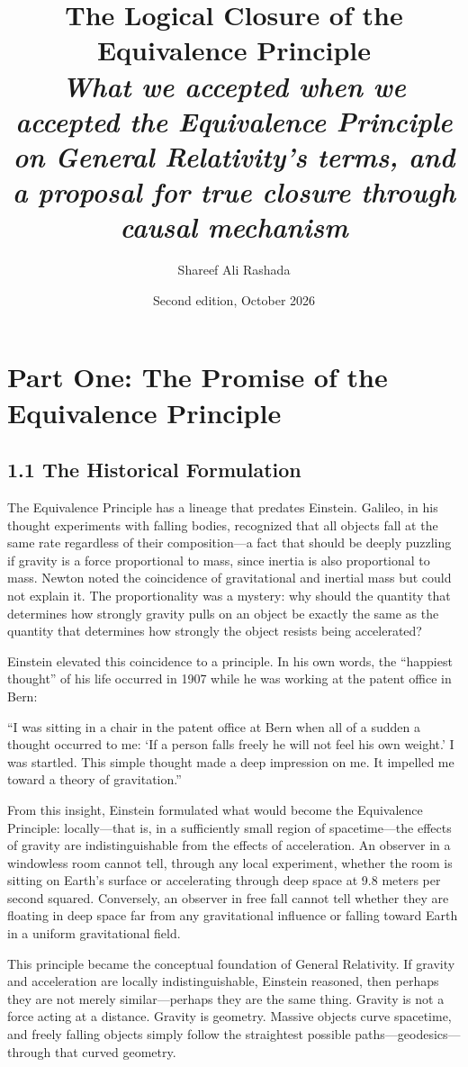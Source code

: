 \documentclass[11pt]{article}
\title{The Logical Closure of the Equivalence Principle\\[0.4em]
\large\itshape What we accepted when we accepted the Equivalence Principle on General Relativity's terms, and a proposal for true closure through causal mechanism}
\author{Shareef Ali Rashada}
\date{Second edition, October 2026}
\begin{document}
\maketitle

\section{Part One: The Promise of the Equivalence Principle}

\subsection{1.1 The Historical Formulation}

The Equivalence Principle has a lineage that predates Einstein. Galileo, in his thought experiments with falling bodies, recognized that all objects fall at the same rate regardless of their composition---a fact that should be deeply puzzling if gravity is a force proportional to mass, since inertia is also proportional to mass. Newton noted the coincidence of gravitational and inertial mass but could not explain it. The proportionality was a mystery: why should the quantity that determines how strongly gravity pulls on an object be exactly the same as the quantity that determines how strongly the object resists being accelerated?

Einstein elevated this coincidence to a principle. In his own words, the ``happiest thought'' of his life occurred in 1907 while he was working at the patent office in Bern:

``I was sitting in a chair in the patent office at Bern when all of a sudden a thought occurred to me: `If a person falls freely he will not feel his own weight.' I was startled. This simple thought made a deep impression on me. It impelled me toward a theory of gravitation.''

From this insight, Einstein formulated what would become the Equivalence Principle: locally---that is, in a sufficiently small region of spacetime---the effects of gravity are indistinguishable from the effects of acceleration. An observer in a windowless room cannot tell, through any local experiment, whether the room is sitting on Earth's surface or accelerating through deep space at 9.8 meters per second squared. Conversely, an observer in free fall cannot tell whether they are floating in deep space far from any gravitational influence or falling toward Earth in a uniform gravitational field.

This principle became the conceptual foundation of General Relativity. If gravity and acceleration are locally indistinguishable, Einstein reasoned, then perhaps they are not merely similar---perhaps they are the same thing. Gravity is not a force acting at a distance. Gravity is geometry. Massive objects curve spacetime, and freely falling objects simply follow the straightest possible paths---geodesics---through that curved geometry.
\end{document}
